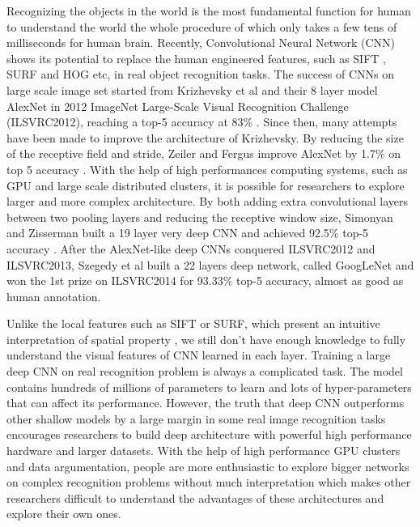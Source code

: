 ﻿Recognizing the objects in the world is the most fundamental function for human to understand the world the whole procedure of which only takes a few tens of milliseconds for human brain. 
Recently, Convolutional Neural Network (CNN) shows its potential to replace the human engineered features, such as SIFT \cite{lowe1999object}, SURF \cite{bay2006surf} and HOG \cite{dalal2005histograms} etc, in real object recognition tasks. The success of CNNs on large scale image set started from Krizhevsky et al and their 8 layer model AlexNet in 2012 ImageNet Large-Scale Visual Recognition Challenge (ILSVRC2012), reaching a top-5 accuracy at 83\% \cite{krizhevsky2012imagenet}. Since then, many attempts have been made to improve the architecture of Krizhevsky.
By reducing the size of the receptive field and stride, Zeiler and Fergus improve AlexNet by 1.7\% on top 5 accuracy \cite{zeiler2014visualizing}. With the help of high performances computing systems, such as GPU and large scale distributed clusters, it is possible for researchers to explore larger and more complex architecture. By both adding extra convolutional layers between two pooling layers and reducing the receptive window size, Simonyan and Zisserman built a 19 layer very deep CNN and achieved 92.5\% top-5 accuracy \cite{simonyan2014very}. After the AlexNet-like deep CNNs conquered ILSVRC2012 and ILSVRC2013, Szegedy et al built a 22 layers deep network, called GoogLeNet and won the 1st prize on ILSVRC2014 for 93.33\% top-5 accuracy, almost as good as human annotation\cite{szegedy2014going}.

Unlike the local features such as SIFT or SURF, which present an intuitive interpretation of spatial property%
, we still don't have enough knowledge to fully understand the visual features of CNN learned in each layer. Training a large deep CNN on real recognition problem is always a complicated task. The model contains hundreds of millions of parameters to learn and lots of hyper-parameters that can affect its performance. However, the truth that deep CNN outperforms other shallow models by a large margin in some real image recognition tasks encourages researchers to build deep architecture with powerful high performance hardware and larger datasets. With the help of high performance GPU clusters and data argumentation, people are more enthusiastic to explore bigger networks on complex recognition problems without much interpretation which makes other researchers difficult to understand the advantages of these architectures and explore their own ones.

